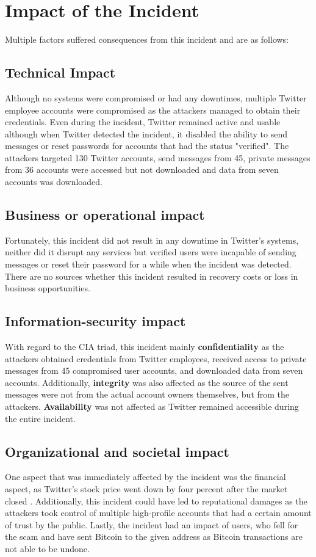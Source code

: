 \chapter{Impact of the Incident}
Multiple factors suffered consequences from this incident and are as follows:
\section{Technical Impact}
Although no systems were compromised or had any downtimes, multiple Twitter employee accounts were compromised as the attackers managed to obtain their credentials.
\newline
Even during the incident, Twitter remained active and usable although when Twitter detected the incident, it disabled the ability to send messages or reset passwords for accounts that had the status "verified".
\newline
The attackers targeted 130 Twitter accounts, send messages from 45, private messages from 36 accounts were accessed but not downloaded and data from seven accounts was downloaded.
\section{Business or operational impact}
Fortunately, this incident did not result in any downtime in Twitter's systems, neither did it disrupt any services but verified users were incapable of sending messages or reset their password for a while when the incident was detected.
\newline
There are no sources whether this incident resulted in recovery costs or loss in business opportunities.
\section{Information-security impact}
With regard to the CIA triad, this incident mainly \textbf{confidentiality} as the attackers obtained credentials from Twitter employees, received access to private messages from 45 compromised user accounts, and downloaded data from seven accounts. Additionally, \textbf{integrity} was also affected as the source of the sent messages were not from the actual account owners themselves, but from the attackers. \textbf{Availability} was not affected as Twitter remained accessible during the entire incident.
\section{Organizational and societal impact}
One aspect that was immediately affected by the incident was the financial aspect, as Twitter's stock price went down by four percent after the market closed \cite{techcrunch}.
\newline
Additionally, this incident could have led to reputational damages as the attackers took control of multiple high-profile accounts that had a certain amount of trust by the public.
\newline
Lastly, the incident had an impact of users, who fell for the scam and have sent Bitcoin to the given address as Bitcoin transactions are not able to be undone.